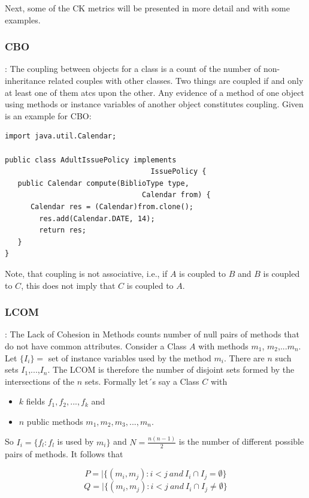 Next, some of the CK metrics will be presented in more detail and with some examples.

\subsubsection{\textbf{CBO}}: The coupling between objects for a class is a count of the number of non-inheritance related couples with other classes. Two things are coupled if and only at least one of them atcs upon the other. Any evidence of a method of one object using methods or instance variables of another object constitutes coupling. Given is an example for CBO: 

\begin{small}
\begin{verbatim}
import java.util.Calendar;
	
public class AdultIssuePolicy implements
	                              IssuePolicy {
   public Calendar compute(BiblioType type, 
   								Calendar from) {
      Calendar res = (Calendar)from.clone();
        res.add(Calendar.DATE, 14);
        return res;
   }
}
\end{verbatim}
\end{small}

Note, that coupling is not associative, i.e., if $A$ is coupled to $B$ and $B$ is coupled to $C$, this does not imply that $C$ is coupled to $A$.

\subsubsection{\textbf{LCOM}}: The Lack of Cohesion in Methods counts number of null pairs of methods that do not have common attributes. Consider a Class $A$ with methods $m_1$, $m_2$,...$m_n$. Let $\{I_i\} =$ set of instance variables used by the method $m_i$. There are $n$ such sets $I_1$,...,$I_n$. The LCOM is therefore the number of disjoint sets formed by the intersections of the $n$ sets. Formally let´s say a Class $C$ with 
\begin{itemize}
	\item $k$ fields $f_1,f_2,...,f_k$ and
	\item $n$ public methods $m_1,m_2,m_3,...,m_n$.
\end{itemize} 
So $I_i= \{f_l:f_l$ is used by $m_i\}$ and $N=\frac{n(n-1)}{2}$ is the number of different possible pairs of methods. It follows that

\begin{displaymath}
	P=|\{(m_i,m_j):i<j \ and \ I_i \cap I_j = \emptyset\}
\end{displaymath}  
\begin{displaymath}
	Q=|\{(m_i,m_j):i<j\ and \ I_i \cap I_j \neq \emptyset\}
\end{displaymath} 

